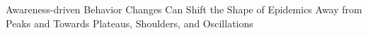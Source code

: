 Awareness-driven Behavior Changes Can Shift the Shape of Epidemics Away from Peaks and Towards Plateaus, Shoulders, and Oscillations
